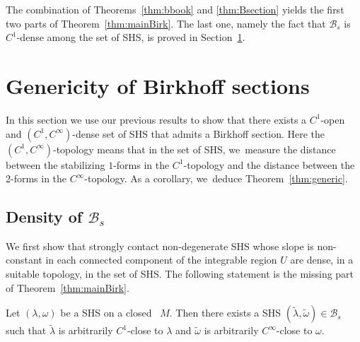 The combination of Theorems~\ref{thm:bbook} and \ref{thm:Bsection} yields the first two parts of Theorem~\ref{thm:mainBirk}. The last one, namely the fact that $\mathcal{B}_s$ is $C^1$-dense among the set of SHS, is proved in Section~\ref{sec:gen}.\enlargethispage{.5\baselineskip}%

\section{Genericity of Birkhoff sections}\label{sec:gen}

In this section we use our previous results to show that there exists a $C^1$-open and $(C^1,C^\infty)$-dense set of SHS that admits a Birkhoff section. Here the $(C^1,C^\infty)$-topology means that in the set of SHS, we~measure the distance between the stabilizing $1$-forms in the $C^1$-topology and the distance between the 2-forms in the $C^\infty$-topology. As a corollary, we~deduce Theorem~\ref{thm:generic}.

\subsection{Density of $\mathcal{B}_s$
}\label{ss:density}

We first show that strongly contact non-degenerate SHS whose slope is non-constant in each connected component of the integrable region $U$ are dense, in a suitable topology, in the set of SHS. The following statement is the missing part of Theorem~\ref{thm:mainBirk}.

\begin{theorem}\label{thm:density}
Let $(\lambda,\omega)$ be a SHS on a closed \threemanifold~$M$. Then there exists a SHS $(\widetilde \lambda, \widetilde \omega) \in \mathcal{B}_s$ such that $\widetilde \lambda$ is arbitrarily $C^1$-close to $\lambda$ and $\widetilde \omega$ is arbitrarily $C^\infty$-close to $\omega$.
\end{theorem}

